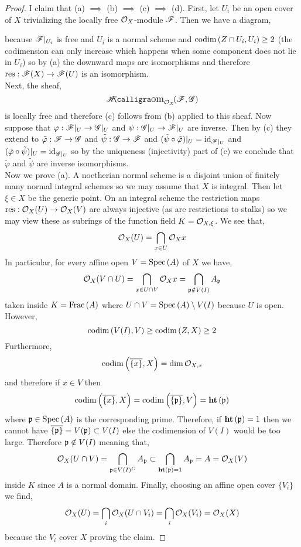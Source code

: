 \documentclass[12pt]{article}
\begin{document}
\begin{proof}
I claim that (a) $\implies$ (b) $\implies$ (c) $\implies$ (d). First, let $U_i$ be an open cover of $X$ trivializing the locally free $\mathcal{O}_{X}$-module $\mathscr{F}$. Then we have a diagram,
\begin{center}
\end{center}
because $\mathscr{F}|_{U_i}$ is free and $U_i$ is a normal scheme and $\mathrm{codim}\left( Z \cap U_i, U_i \right) \ge 2$ (the codimension can only increase which happens when some component does not lie in $U_i$) so by (a) the downward maps are isomorphisms and therefore $\mathrm{res} : \mathscr{F}(X) \to \mathscr{F}(U)$ is an isomorphism. 
\bigskip\\
Next, the sheaf,
\[ \shHom{\struct{X}}{\F}{\G} \]
is locally free and therefore (c) follows from (b) applied to this sheaf. Now suppose that $\varphi : \mathscr{F}|_U \to \mathscr{G}|_U$ and $\psi : \mathscr{G}|_U \to \mathscr{F}|_U$ are inverse. Then by (c) they extend to $\tilde{\varphi} : \mathscr{F} \to \mathscr{G}$ and $\tilde{\psi} : \mathscr{G} \to \mathscr{F}$ and $(\tilde{\psi} \circ \tilde{\varphi})|_U = \mathrm{id}_{\mathscr{F}|_U}$ and $(\tilde{\varphi} \circ \tilde{\psi})|_U = \mathrm{id}_{\mathscr{G}|_U}$ so by the uniqueness (injectivity) part of (c) we conclude that $\tilde{\varphi}$ and $\tilde{\psi}$ are inverse isomorphisms. 
\bigskip\\
Now we prove (a). A noetherian normal scheme is a disjoint union of finitely many normal integral schemes so we may assume that $X$ is integral. Then let $\xi \in X$ be the generic point. On an integral scheme the restriction maps $\mathrm{res} : \mathcal{O}_{X}(U) \to \mathcal{O}_{X}(V)$ are always injective (as are restrictions to stalks) so we may view these as subrings of the function field $K = \mathcal{O}_{X, \xi}$. We see that,
\[ \mathcal{O}_{X}(U) = \bigcap_{x \in U} \mathcal{O}_{X}{x} \]
In particular, for every affine open $V = \mathrm{Spec}\left( A \right)$ of $X$ we have,
\[ \mathcal{O}_{X}(V \cap U) = \bigcap_{x \in U \cap V} \mathcal{O}_{X}{x} = \bigcap_{\mathfrak{p} \notin V(I)} A_{\mathfrak{p}} \]
taken inside $K = \mathrm{Frac}\left(A\right)$ where $U \cap V = \mathrm{Spec}\left( A \right) \setminus V(I)$ because $U$ is open. However, 
\[ \mathrm{codim}\left( V(I), V \right) \ge \mathrm{codim}\left( Z, X \right) \ge 2 \]
Furthermore,
\[ \mathrm{codim}\left(  \overline{ \{ x \}} , X \right) = \dim{\mathcal{O}_{X, x}} \]
and therefore if $x \in V$ then
\[ \mathrm{codim}\left(  \overline{ \{ x \} }, X \right) = \mathrm{codim}\left(  \overline{\{ \mathfrak{p} \}}, V \right) = \mathbf{ht}\left( \mathfrak{p} \right) \]
where $\mathfrak{p} \in \mathrm{Spec}\left( A \right)$ is the corresponding prime. Therefore, if $\mathbf{ht}\left( \mathfrak{p} \right) = 1$ then we cannot have $\overline{ \{ \mathfrak{p} \} } = V(\mathfrak{p}) \subset V(I)$ else the codimension of $V(I)$ would be too large. Therefore $\mathfrak{p} \notin V(I)$ meaning that,
\[ \mathcal{O}_{X}(U \cap V) = \bigcap_{\mathfrak{p} \in V(I)^C} A_{\mathfrak{p}} \subset \bigcap_{\mathbf{ht}\left( \mathfrak{p} \right) = 1} A_{\mathfrak{p}} = A = \mathcal{O}_{X}(V) \]
inside $K$ since $A$ is a normal domain. Finally, choosing an affine open cover $\{ V_i \}$ we find,
\[ \mathcal{O}_{X}(U) = \bigcap_{i} \mathcal{O}_{X}(U \cap V_i) = \bigcap_i \mathcal{O}_{X}(V_i) = \mathcal{O}_{X}(X) \]
because the $V_i$ cover $X$ proving the claim. 
\end{proof}
\end{document}
